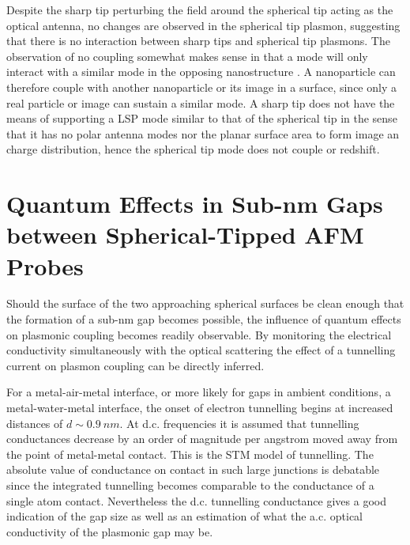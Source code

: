 \documentclass[a4paper]{article}
\begin{document}
Despite the sharp tip perturbing the field around the spherical tip acting as the optical antenna, no changes are observed in the spherical tip plasmon, suggesting that there is no interaction between sharp tips and spherical tip plasmons.
{\color{red}The observation of no coupling somewhat makes sense in that a mode will only interact with a similar mode in the opposing nanostructure \cite{nordlander2004}.} A nanoparticle can therefore couple with another nanoparticle or its image in a surface, since only a real particle or image can sustain a similar mode. A sharp tip does not have the means of supporting a LSP mode similar to that of the spherical tip in the sense that it has no polar antenna modes nor the planar surface area to form image an charge distribution, hence the spherical tip mode does not couple or redshift.


\section{Quantum Effects in Sub-nm Gaps between Spherical-Tipped AFM Probes}

Should the surface of the two approaching spherical surfaces be clean enough that the formation of a sub-nm gap becomes possible, the influence of quantum effects on plasmonic coupling becomes readily observable. By monitoring the electrical conductivity simultaneously with the optical scattering the effect of a tunnelling current on plasmon coupling can be directly inferred.

For a metal-air-metal interface, or more likely for gaps in ambient conditions, a metal-water-metal interface, the onset of electron tunnelling begins at increased distances of $d \sim \SI{0.9}{nm}$. At d.c. frequencies it is assumed that tunnelling conductances decrease by an order of magnitude per angstrom moved away from the point of metal-metal contact. This is the STM model of tunnelling. The absolute value of conductance on contact in such large junctions is debatable since the integrated tunnelling becomes comparable to the conductance of a single atom contact. Nevertheless the d.c. tunnelling conductance gives a good indication of the gap size as well as an estimation of what the a.c. optical conductivity of the plasmonic gap may be.
\end{document}
